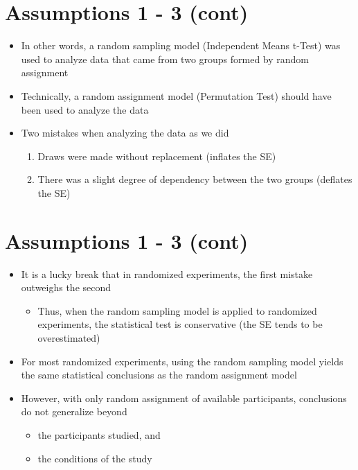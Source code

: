 \documentclass[12pt]{article}
\begin{document}
\section{Assumptions 1 - 3 (cont)}\label{assumptions-1---3-cont}

\begin{itemize}
\itemsep1pt\parskip0pt
\item
  In other words, a random sampling model (Independent Means t-Test) was
  used to analyze data that came from two groups formed by random
  assignment
\item
  Technically, a random assignment model (Permutation Test) should have
  been used to analyze the data
\item
  Two mistakes when analyzing the data as we did

  \begin{enumerate}
  \def\labelenumi{\arabic{enumi}.}
  \itemsep1pt\parskip0pt
  \item
    Draws were made without replacement (inflates the SE)
  \item
    There was a slight degree of dependency between the two groups
    (deflates the SE)
  \end{enumerate}
\end{itemize}

\section{Assumptions 1 - 3 (cont)}\label{assumptions-1---3-cont-1}

\begin{itemize}
\itemsep1pt\parskip0pt
\item
  It is a lucky break that in randomized experiments, the first mistake
  outweighs the second

  \begin{itemize}
  \itemsep1pt\parskip0pt
  \item
    Thus, when the random sampling model is applied to randomized
    experiments, the statistical test is conservative (the SE tends to
    be overestimated)
  \end{itemize}
\item
  For most randomized experiments, using the random sampling model
  yields the same statistical conclusions as the random assignment model
\item
  However, with only random assignment of available participants,
  conclusions do not generalize beyond

  \begin{itemize}
  \itemsep1pt\parskip0pt
  \item
    the participants studied, and
  \item
    the conditions of the study
  \end{itemize}
\end{itemize}
\end{document}
